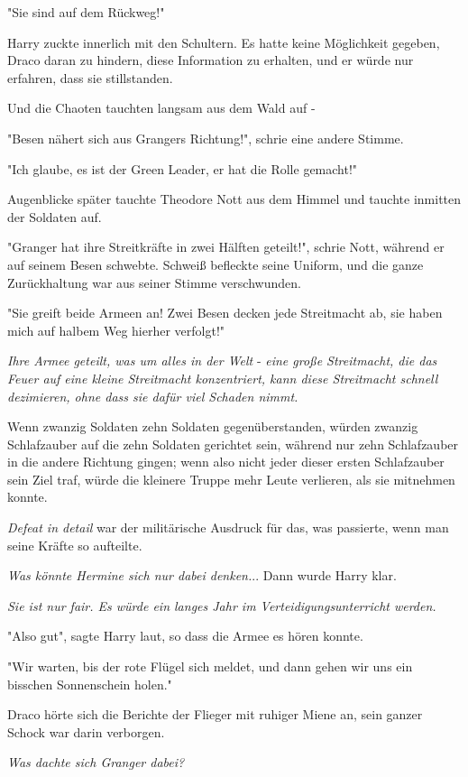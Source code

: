 {"Sie sind auf dem Rückweg!"

Harry zuckte innerlich mit den Schultern. Es hatte keine Möglichkeit gegeben, Draco daran zu hindern, diese Information zu erhalten, und er würde nur erfahren, dass sie stillstanden.

Und die Chaoten tauchten langsam aus dem Wald auf -

"Besen nähert sich aus Grangers Richtung!", schrie eine andere Stimme.

"Ich glaube, es ist der Green Leader, er hat die Rolle gemacht!"

Augenblicke später tauchte Theodore Nott aus dem Himmel und tauchte inmitten der Soldaten auf.

"Granger hat ihre Streitkräfte in zwei Hälften geteilt!", schrie Nott, während er auf seinem Besen schwebte. Schweiß befleckte seine Uniform, und die ganze Zurückhaltung war aus seiner Stimme verschwunden.

"Sie greift beide Armeen an! Zwei Besen decken jede Streitmacht ab, sie haben mich auf halbem Weg hierher verfolgt!"

\emph{Ihre Armee geteilt, was um alles in der Welt} - \emph{eine große Streitmacht, die das Feuer auf eine kleine Streitmacht konzentriert, kann diese Streitmacht schnell dezimieren, ohne dass sie dafür viel Schaden nimmt.}

Wenn zwanzig Soldaten zehn Soldaten gegenüberstanden, würden zwanzig Schlafzauber auf die zehn Soldaten gerichtet sein, während nur zehn Schlafzauber in die andere Richtung gingen; wenn also nicht jeder dieser ersten Schlafzauber sein Ziel traf, würde die kleinere Truppe mehr Leute verlieren, als sie mitnehmen konnte.

\emph{Defeat in detail} war der militärische Ausdruck für das, was passierte, wenn man seine Kräfte so aufteilte.

\emph{Was könnte Hermine sich nur dabei denken.}.. Dann wurde Harry klar.

\emph{Sie ist nur fair. Es würde ein langes Jahr im Verteidigungsunterricht werden.}

"Also gut", sagte Harry laut, so dass die Armee es hören konnte.

"Wir warten, bis der rote Flügel sich meldet, und dann gehen wir uns ein bisschen Sonnenschein holen."

Draco hörte sich die Berichte der Flieger mit ruhiger Miene an, sein ganzer Schock war darin verborgen.

\emph{Was dachte sich Granger dabei?}

}
